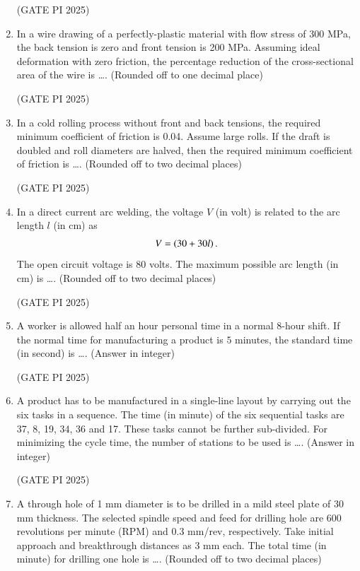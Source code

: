 \documentclass[journal,12pt,onecolumn]{IEEEtran}
\theoremstyle{remark}
\begin{document}
\begin{enumerate}
\hfill (GATE PI 2025)

\item In a wire drawing of a perfectly-plastic material with flow stress of 300 MPa, the back tension is zero and front tension is 200 MPa. Assuming ideal deformation with zero friction, the percentage reduction of the cross-sectional area of the wire is \dots. (Rounded off to one decimal place)

\hfill (GATE PI 2025)

\item In a cold rolling process without front and back tensions, the required minimum coefficient of friction is 0.04. Assume large rolls. If the draft is doubled and roll diameters are halved, then the required minimum coefficient of friction is \dots. (Rounded off to two decimal places)

\hfill (GATE PI 2025)

\item In a direct current arc welding, the voltage $V$ (in volt) is related to the arc length $l$ (in cm) as
\begin{align*}
V=\left(30+30l\right).
\end{align*}
The open circuit voltage is $80$ volts. The maximum possible arc length (in cm) is \dots. (Rounded off to two decimal places)

\hfill (GATE PI 2025)

\item A worker is allowed half an hour personal time in a normal 8-hour shift. If the normal time for manufacturing a product is $5$ minutes, the standard time (in second) is \dots. (Answer in integer)

\hfill (GATE PI 2025)

\item A product has to be manufactured in a single-line layout by carrying out the six tasks in a sequence. The time (in minute) of the six sequential tasks are 37, 8, 19, 34, 36 and 17. These tasks cannot be further sub-divided. For minimizing the cycle time, the number of stations to be used is \dots. (Answer in integer)

\hfill (GATE PI 2025)

\item A through hole of 1 mm diameter is to be drilled in a mild steel plate of 30 mm thickness. The selected spindle speed and feed for drilling hole are 600 revolutions per minute (RPM) and 0.3 mm/rev, respectively. Take initial approach and breakthrough distances as 3 mm each. The total time (in minute) for drilling one hole is \dots. (Rounded off to two decimal places)


\end{enumerate}
\end{document}
